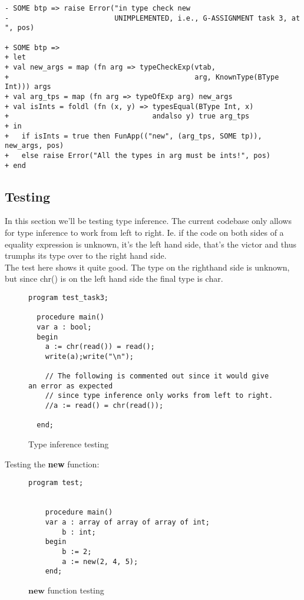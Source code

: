 \begin{lstlisting}[style=MLStyle]
- SOME btp => raise Error("in type check new 
-                         UNIMPLEMENTED, i.e., G-ASSIGNMENT task 3, at ", pos)

+ SOME btp => 
+ let
+ val new_args = map (fn arg => typeCheckExp(vtab,
+                                            arg, KnownType(BType Int))) args
+ val arg_tps = map (fn arg => typeOfExp arg) new_args
+ val isInts = foldl (fn (x, y) => typesEqual(BType Int, x) 
+                                  andalso y) true arg_tps 
+ in
+   if isInts = true then FunApp(("new", (arg_tps, SOME tp)), new_args, pos)
+   else raise Error("All the types in arg must be ints!", pos)
+ end
\end{lstlisting}
\subsection{Testing}
In this section we'll be testing type inference. The current codebase only
allows for type inference to work from left to right. Ie. if the code on both
sides of a equality expression is unknown, it's the left hand side, that's the
victor and thus trumphs its type over to the right hand side.\\
The test here shows it quite good. The type on the righthand side is unknown,
but since chr() is on the left hand side the final type is char.
\begin{figure}[H]
  \begin{lstlisting}[style=paladim]
  program test_task3;
  
  procedure main()
  var a : bool;
  begin
    a := chr(read()) = read();
    write(a);write("\n");
  
    // The following is commented out since it would give an error as expected
    // since type inference only works from left to right.
    //a := read() = chr(read());
  
  end;
  \end{lstlisting}
\caption{Type inference testing}
\end{figure}

\noindent
Testing the \textbf{new} function:
\begin{figure}[H]
  \begin{lstlisting}[style=paladim]
    program test;
    
    
    procedure main()
    var a : array of array of array of int;
        b : int;
    begin 
        b := 2;
        a := new(2, 4, 5);
    end;
  \end{lstlisting}
\caption{$\textbf{new}$ function testing}
\end{figure}
